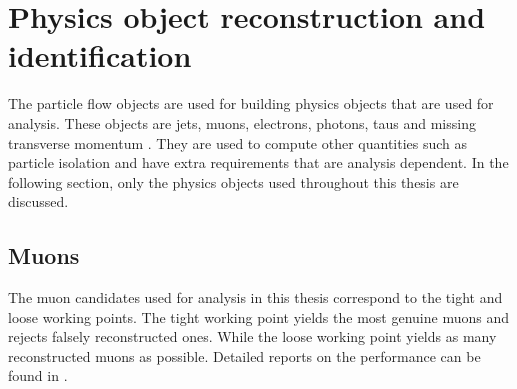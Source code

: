 \section{Physics object reconstruction and identification}
\label{sec:PhysicsObject}
The particle flow objects are used for building physics objects that are used for analysis. These objects are jets, muons, electrons, photons, taus and missing transverse momentum \ptmisvec. They are used to compute other quantities such as particle isolation and have extra requirements that are analysis dependent. In the following section, only the physics objects used throughout this thesis are discussed. 

\subsection{Muons}
\label{sec:MuonID}
The muon candidates used for analysis in this thesis correspond to the tight and loose working points. The tight working point yields the most genuine muons and rejects falsely reconstructed ones. While the loose working point yields as many reconstructed muons as possible. Detailed reports on the performance can be found in \todocite.


